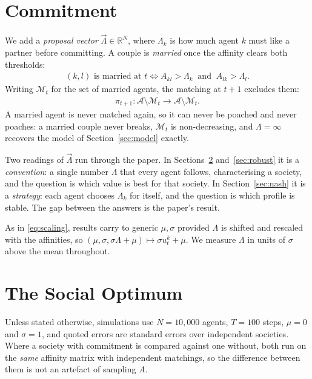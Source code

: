 \documentclass[sigconf,anonymous]{aamas}
\newcommand{\Ag}{\mathcal{A}}
\newcommand{\Mset}{\mathcal{M}}
\newcommand{\R}{\mathbb{R}}
\begin{document}
\section{Commitment}
\label{sec:marriage}

We add a \emph{proposal vector} $\vec{\Lambda} \in \R^N$, where $\Lambda_k$ is
how much agent $k$ must like a partner before committing. A couple is
\emph{married} once the affinity clears both thresholds:
%
\begin{align}
  \text{$(k,l)$ is married at $t$}
  \iff
  A_{kl} > \Lambda_k \ \text{ and }\ A_{lk} > \Lambda_l .
  \label{eq:married}
\end{align}
%
Writing $\Mset_t$ for the set of married agents, the matching at $t+1$ excludes
them:
%
\begin{align}
  \pi_{t+1} :
  \Ag \setminus \Mset_t \rightarrow \Ag \setminus \Mset_t .
  \label{eq:marriedmatching}
\end{align}
%
A married agent is never matched again, so it can never be poached and never
poaches: a married couple never breaks, $\Mset_t$ is non-decreasing, and
$\Lambda = \infty$ recovers the model of Section~\ref{sec:model} exactly.

Two readings of $\vec{\Lambda}$ run through the paper. In
Sections~\ref{sec:optimum} and~\ref{sec:robust} it is a \emph{convention}: a
single number $\Lambda$ that every agent follows, characterising a society, and
the question is which value is best for that society. In
Section~\ref{sec:nash} it is a \emph{strategy}: each agent chooses $\Lambda_k$
for itself, and the question is which profile is stable. The gap between the
answers is the paper's result.

As in \eqref{eq:scaling}, results carry to generic $\mu, \sigma$ provided
$\Lambda$ is shifted and rescaled with the affinities, so
$(\mu, \sigma, \sigma\Lambda + \mu) \mapsto \sigma u_t^k + \mu$. We measure
$\Lambda$ in units of $\sigma$ above the mean throughout.


\section{The Social Optimum}
\label{sec:optimum}

Unless stated otherwise, simulations use $N = 10{,}000$ agents, $T = 100$ steps,
$\mu = 0$ and $\sigma = 1$, and quoted errors are standard errors over
independent societies. Where a society with commitment is compared against one
without, both run on the \emph{same} affinity matrix with independent matchings,
so the difference between them is not an artefact of sampling $A$.
\end{document}
